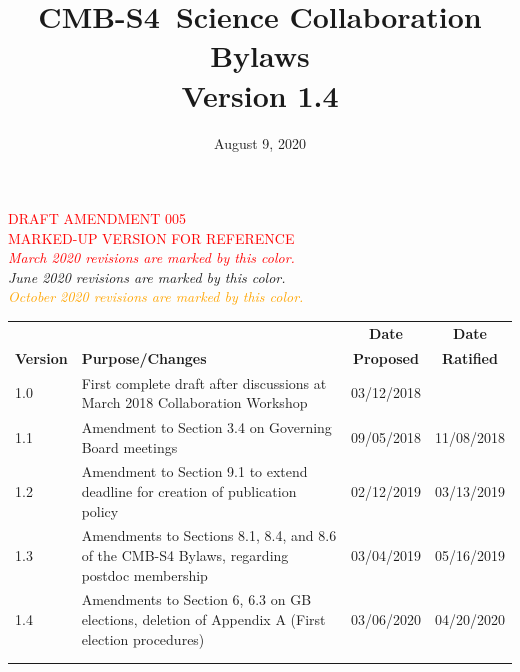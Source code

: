 \documentclass[12pt]{article}
\newcommand\versionnumber{1.4}
\newcommand\collabname{CMB-S4}
\newcommand{\revision}[1]{\textcolor{Red}{#1}}
\newcommand{\revtwo}[1]{\textcolor{Emerald}{#1}}
\newcommand{\revthree}[1]{\textcolor{Orange}{#1}}
\begin{document}
 {\newcommand\markcolor{black}}


\title{\collabname\ Science Collaboration Bylaws \\ 
\large{Version \versionnumber}}
\date{August 9, 2020}
\maketitle

\vfill


\revision{\Large DRAFT AMENDMENT 005\\ MARKED-UP VERSION FOR REFERENCE \\}
\textit{\revision{March 2020 revisions are marked by this color.\\}
  \revtwo{June 2020 revisions are marked by this color.\\}
  \revthree{October 2020 revisions are marked by this color.\\}}
  

\begin{table}[h]
\begin{center}
\begin{tabular}{| l | p{3.7in} | c | c |}
\hline
&  & {\bf Date} & {\bf Date}  \\
{\bf Version}  &  \hspace{1.0in} {\bf Purpose/Changes} & {\bf Proposed} & {\bf Ratified} \\
\hline\hline
1.0 & First complete draft after discussions at March 2018 Collaboration Workshop & 03/12/2018 & \\ \hline
1.1 & Amendment to Section 3.4 on Governing Board meetings & 09/05/2018 & 11/08/2018 \\ \hline
1.2 & Amendment to Section 9.1 to extend deadline for creation of publication policy & 02/12/2019 & 03/13/2019\\  \hline %
1.3 & Amendments to Sections 8.1, 8.4, and 8.6 of the CMB-S4 Bylaws, regarding postdoc membership & 03/04/2019 & 05/16/2019 \\ \hline
1.4 & Amendments to Section 6, 6.3 on GB elections, deletion of Appendix A (First election procedures) & 03/06/2020 & 04/20/2020 \\ \hline
& & & \\
& & &\\ \hline
\end{tabular}
\end{center}
\label{tab:version}
\end{table}%
\end{document}
